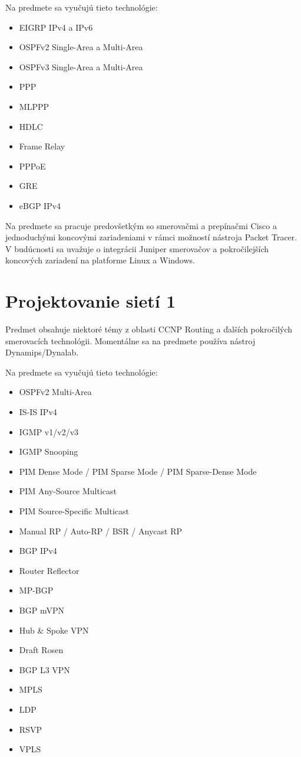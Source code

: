Na predmete sa vyučujú tieto technológie:

\begin{itemize}
    \item EIGRP IPv4 a IPv6
    \item OSPFv2 Single-Area a Multi-Area
    \item OSPFv3 Single-Area a Multi-Area
    \item PPP
    \item MLPPP
    \item HDLC
    \item Frame Relay	
    \item PPPoE
    \item GRE
    \item eBGP IPv4
\end{itemize}

Na predmete sa pracuje predovšetkým so smerovačmi a prepínačmi Cisco a jednoduchými koncovými zariadeniami v rámci možností nástroja Packet Tracer. V budúcnosti sa uvažuje o integrácii Juniper smerovačov a pokročilejších koncových zariadení na platforme Linux a Windows.




\section{Projektovanie sietí 1}

Predmet obsahuje niektoré témy z oblasti CCNP Routing a ďalších pokročilých smerovacích technológii. Momentálne sa na predmete používa nástroj Dynamips/Dynalab.

Na predmete sa vyučujú tieto technológie:

\begin{itemize}
    \item OSPFv2 Multi-Area
    \item IS-IS IPv4 
    \item IGMP v1/v2/v3
    \item IGMP Snooping
    \item PIM Dense Mode / PIM Sparse Mode / PIM Sparse-Dense Mode
    \item PIM Any-Source Multicast
    \item PIM Source-Specific Multicast
    \item Manual RP / Auto-RP / BSR / Anycast RP
    \item BGP IPv4
    \item Router Reflector
    \item MP-BGP
    \item BGP mVPN
    \item Hub \& Spoke VPN
    \item Draft Rosen
    \item BGP L3 VPN
    \item MPLS
    \item LDP
    \item RSVP
    \item VPLS
\end{itemize}


